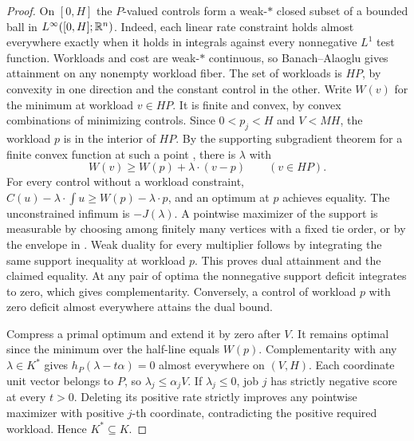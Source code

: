 \begin{proof}
On $[0,H]$ the $P$-valued controls form a weak-$*$ closed subset of a bounded ball in $L^\infty([0,H];\mathbb R^n)$. Indeed, each linear rate constraint holds almost everywhere exactly when it holds in integrals against every nonnegative $L^1$ test function. Workloads and cost are weak-$*$ continuous, so Banach--Alaoglu gives attainment on any nonempty workload fiber. The set of workloads is $HP$, by convexity in one direction and the constant control in the other. Write $W(v)$ for the minimum at workload $v\in HP$. It is finite and convex, by convex combinations of minimizing controls. Since $0<p_j<H$ and $V<MH$, the workload $p$ is in the interior of $HP$. By the supporting subgradient theorem for a finite convex function at such a point \cite[Theorem~23.4]{rockafellar1970}, there is $\lambda$ with
\[
 W(v)\geq W(p)+\lambda\cdot(v-p)\qquad(v\in HP).
\]
For every control without a workload constraint, $C(u)-\lambda\cdot\int u\geq W(p)-\lambda\cdot p$, and an optimum at $p$ achieves equality. The unconstrained infimum is $-J(\lambda)$. A pointwise maximizer of the support is measurable by choosing among finitely many vertices with a fixed tie order, or by the envelope in . Weak duality for every multiplier follows by integrating the same support inequality at workload $p$. This proves dual attainment and the claimed equality. At any pair of optima the nonnegative support deficit integrates to zero, which gives complementarity. Conversely, a control of workload $p$ with zero deficit almost everywhere attains the dual bound.

Compress a primal optimum and extend it by zero after $V$. It remains optimal since the minimum over the half-line equals $W(p)$. Complementarity with any $\lambda\in K^*$ gives $h_P(\lambda-t\alpha)=0$ almost everywhere on $(V,H)$. Each coordinate unit vector belongs to $P$, so $\lambda_j\leq\alpha_j V$. If $\lambda_j\leq0$, job $j$ has strictly negative score at every $t>0$. Deleting its positive rate strictly improves any pointwise maximizer with positive $j$-th coordinate, contradicting the positive required workload. Hence $K^*\subseteq K$.
\end{proof}
